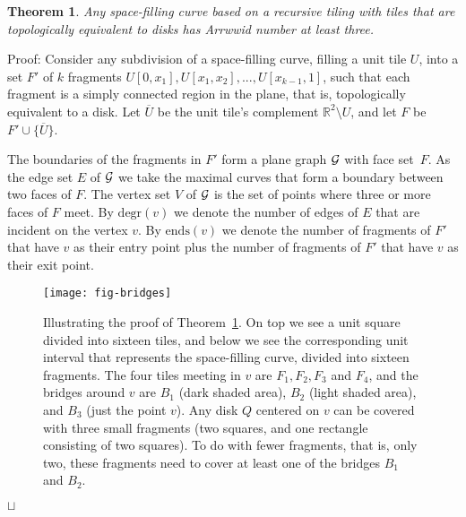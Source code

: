 \documentclass[11pt,a4paper]{article}
\newcommand{\Reals}{\mathbb{R}}
\newcommand{\unittile}{\ensuremath{U}\xspace}
\newcommand{\degr}{\mathrm{degr}}
\newcommand{\doors}{\mathrm{ends}}
\newtheorem{theorem}{Theorem}
\newenvironment{proof}{Proof:}{\qed}
\def\squareforqed{\hbox{\rlap{$\sqcap$}$\sqcup$}}
\def\qed{\ifmmode\squareforqed\else{\unskip\nobreak\hfil
\penalty50\hskip1em\null\nobreak\hfil\squareforqed
\parfillskip=0pt\finalhyphendemerits=0\endgraf}\fi}
\begin{document}
\begin{theorem}\label{th:2dsfclb}
Any space-filling curve based on a recursive tiling with tiles that are topologically equivalent to disks has Arrwwid number at least three.
\end{theorem}
\begin{proof}
Consider any subdivision of a space-filling curve, filling a unit tile \unittile, into a set $F'$ of $k$ fragments $\unittile[0,x_1], \unittile[x_1,x_2], ..., \unittile[x_{k-1},1]$, such that each fragment is a simply connected region in the plane, that is, topologically equivalent to a disk. Let $\overline{\unittile}$ be the unit tile's complement $\Reals^2 \setminus \unittile$, and let $F$ be $F' \cup \{\overline{\unittile}\}$.

The boundaries of the fragments in $F'$ form a plane graph ${\cal G}$ with face set~$F$. As the edge set $E$ of ${\cal G}$ we take the maximal curves that form a boundary between two faces of $F$. The vertex set $V$ of ${\cal G}$ is the set of points where three or more faces of $F$ meet. By $\degr(v)$ we denote the number of edges of $E$ that are incident on the vertex $v$. By $\doors(v)$ we denote the number of fragments of $F'$ that have $v$ as their entry point plus the number of fragments of $F'$ that have $v$ as their exit point.

\begin{figure}
\centering
\texttt{[image: fig-bridges]}
\caption{Illustrating the proof of Theorem~\ref{th:2dsfclb}. On top we see a unit square divided into sixteen tiles, and below we see the corresponding unit interval that represents the space-filling curve, divided into sixteen fragments. The four tiles meeting in $v$ are $F_1, F_2, F_3$ and $F_4$, and the bridges around $v$ are $B_1$ (dark shaded area), $B_2$ (light shaded area), and $B_3$ (just the point $v$). Any disk $Q$ centered on $v$ can be covered with three small fragments (two squares, and one rectangle consisting of two squares). To do with fewer fragments, that is, only two, these fragments need to cover at least one of the bridges $B_1$ and $B_2$.}
\label{fig:bridges}
\end{figure}


\end{proof}
\end{document}
